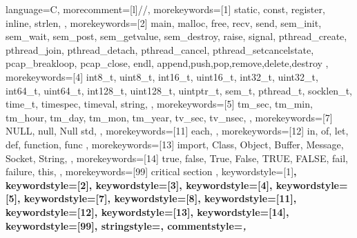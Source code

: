 {%
    language=C,%
    morecomment=[l]{//},%
    morekeywords=[1]{%
        static,
        const,
        register,
        inline,
        strlen,
    },%
    morekeywords=[2]{%
        main,
        malloc,
        free,
        recv,
        send,
        sem_init,
        sem_wait,
        sem_post,
        sem_getvalue,
        sem_destroy,
        raise,
        signal,
        pthread_create,
        pthread_join,
        pthread_detach,
        pthread_cancel,
        pthread_setcancelstate,
        pcap_breakloop,
        pcap_close,
        endl,
        append,push,pop,remove,delete,destroy
    },%
    morekeywords=[4]{%
        int8_t,
        uint8_t,
        int16_t,
        uint16_t,
        int32_t,
        uint32_t,
        int64_t,
        uint64_t,
        int128_t,
        uint128_t,
        uintptr_t,
        sem_t,
        pthread_t,
        socklen_t,
        time_t,
        timespec,
        timeval,
        string,
    },%
    morekeywords=[5]{%
        tm_sec,
        tm_min,
        tm_hour,
        tm_day,
        tm_mon,
        tm_year,
        tv_sec,
        tv_nsec,
    },%
    morekeywords=[7]{%
        NULL, null, Null
        std,
    },%
    morekeywords=[11]{%
        each, 
    },%
    morekeywords=[12]{%
        in, of, let, def,
        function, func
    },%
    morekeywords=[13]{%
        import,
        Class, Object,
        Buffer, Message,
        Socket, String,
    },%
    morekeywords=[14]{%
        true, false, True, False, TRUE, FALSE,
        fail, failure,
        this,
    },%
    morekeywords=[99]{%
        critical section
    },%
    keywordstyle=[1]\color{lstCol_C_purple}\bfseries,%
    keywordstyle=[2]\color{lstCol_C_violet}\bfseries,%
    keywordstyle=[3]\color{lstCol_C_purple},%
    keywordstyle=[4]\color{lstCol_C_green},%
    keywordstyle=[5]\color{lstCol_C_blue},%
    keywordstyle=[7]\color{lstCol_C_purple},%
    keywordstyle=[8]\color{lstCol_C_violet},%
    keywordstyle=[11]\color{lstCol_C_foreign1}\bfseries,%
    keywordstyle=[12]\color{lstCol_C_foreign2}\bfseries,%
    keywordstyle=[13]\color{lstCol_C_object},%
    keywordstyle=[14]\color{lstCol_C_moreKey},%
    keywordstyle=[99]\color{red}\bfseries,%
    stringstyle=\color{eclipse_1_string},%
    commentstyle=\color{eclipse_1_comment}\itshape,%
}%
